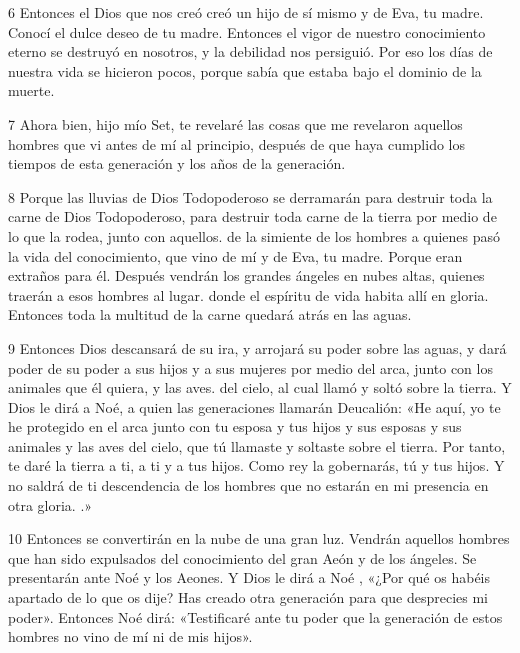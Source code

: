 \par 6 Entonces el Dios que nos creó creó un hijo de sí mismo y de Eva, tu madre. Conocí el dulce deseo de tu madre. Entonces el vigor de nuestro conocimiento eterno se destruyó en nosotros, y la debilidad nos persiguió. Por eso los días de nuestra vida se hicieron pocos, porque sabía que estaba bajo el dominio de la muerte.

\par 7 Ahora bien, hijo mío Set, te revelaré las cosas que me revelaron aquellos hombres que vi antes de mí al principio, después de que haya cumplido los tiempos de esta generación y los años de la generación.

\par 8 Porque las lluvias de Dios Todopoderoso se derramarán para destruir toda la carne de Dios Todopoderoso, para destruir toda carne de la tierra por medio de lo que la rodea, junto con aquellos. de la simiente de los hombres a quienes pasó la vida del conocimiento, que vino de mí y de Eva, tu madre. Porque eran extraños para él. Después vendrán los grandes ángeles en nubes altas, quienes traerán a esos hombres al lugar. donde el espíritu de vida habita allí en gloria. Entonces toda la multitud de la carne quedará atrás en las aguas.

\par 9 Entonces Dios descansará de su ira, y arrojará su poder sobre las aguas, y dará poder de su poder a sus hijos y a sus mujeres por medio del arca, junto con los animales que él quiera, y las aves. del cielo, al cual llamó y soltó sobre la tierra. Y Dios le dirá a Noé, a quien las generaciones llamarán Deucalión: «He aquí, yo te he protegido en el arca junto con tu esposa y tus hijos y sus esposas y sus animales y las aves del cielo, que tú llamaste y soltaste sobre el tierra. Por tanto, te daré la tierra a ti, a ti y a tus hijos. Como rey la gobernarás, tú y tus hijos. Y no saldrá de ti descendencia de los hombres que no estarán en mi presencia en otra gloria. .»

\par 10 Entonces se convertirán en la nube de una gran luz. Vendrán aquellos hombres que han sido expulsados ​​del conocimiento del gran Aeón y de los ángeles. Se presentarán ante Noé y los Aeones. Y Dios le dirá a Noé , «¿Por qué os habéis apartado de lo que os dije? Has creado otra generación para que desprecies mi poder». Entonces Noé dirá: «Testificaré ante tu poder que la generación de estos hombres no vino de mí ni de mis hijos».

